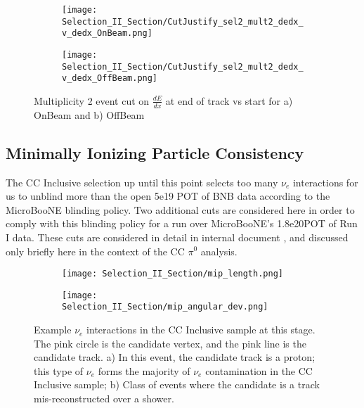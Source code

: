 \begin{figure}[H]
\centering
\begin{subfigure}[t]{0.25\textwidth}
    \centering
\texttt{[image: Selection\_II\_Section/CutJustify\_sel2\_mult2\_dedx\_v\_dedx\_OnBeam.png]}
    \caption{ }
  \end{subfigure} 
  \hspace{10mm}
  \begin{subfigure}[t]{0.25\textwidth}
    \centering
    \texttt{[image: Selection\_II\_Section/CutJustify\_sel2\_mult2\_dedx\_v\_dedx\_OffBeam.png]}
    \caption{ }
  \end{subfigure} 

\caption{ Multiplicity 2 event cut on $\frac{dE}{dx}$ at end of track vs start for a) OnBeam and b) OffBeam }
\label{fig:cutjust_sel2_onbeam_mult2_dedx_v_dedx}
\end{figure}



\clearpage
\subsection{ Minimally Ionizing Particle Consistency}

The CC Inclusive selection up until this point selects too many $\nu_e$ interactions for us to unblind more than the open 5e19 POT of BNB data according to the MicroBooNE blinding policy. Two additional cuts are considered here in order to comply with this blinding policy for a run over MicroBooNE's 1.8e20POT of Run I data. These cuts are considered in detail in internal document \cite{bib:jz_unblinding_note}, and discussed only briefly here in the context of the CC $\pi^0$ analysis. 


\begin{figure}[H]
  \begin{subfigure}[t]{0.55\textwidth}
\texttt{[image: Selection\_II\_Section/mip\_length.png]}
    \caption{ }
  \end{subfigure} 
  \hspace{4mm}
  \begin{subfigure}[t]{0.75\textwidth}
\texttt{[image: Selection\_II\_Section/mip\_angular\_dev.png]}
    \caption{ }
  \end{subfigure} 
\caption{ Example $\nu_e$ interactions in the CC Inclusive sample at this stage.  The pink circle is the candidate vertex, and the pink line is the candidate track. a) In this event, the candidate track is a proton; this type of $\nu_e$ forms the majority of $\nu_e$ contamination in the CC Inclusive sample; b) Class of events where the candidate is a track mis-reconstructed over a shower. }
\label{fig:mip_ex_len_angular}
\end{figure}


